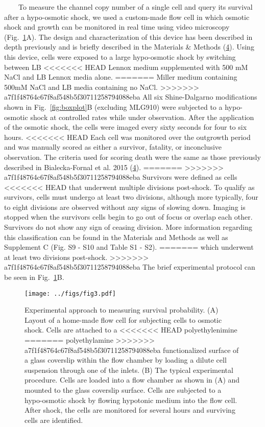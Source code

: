 ~~~~To
measure
the
channel
copy
number
of a
single
cell
and
query
its
survival
after
a
hypo-osmotic
shock,
we
used a
custom-made
flow
cell
in
which
osmotic
shock
and
growth
can be
monitored
in
real
time
using
video
microscopy
(Fig.~\ref{fig:flow_cell}A).
The
design
and
characterization
of
this
device
has
been
described
in
depth
previously
and is
briefly
described
in the
Materials
\&
Methods
(\protect\hyperlink{ref-bialecka-fornal2015}{4}).
Using
this
device,
cells
were
exposed
to a
large
hypo-osmotic
shock
by
switching
between
LB
<<<<<<< HEAD
Lennox
medium
supplemented
with
500 mM
NaCl
and LB
Lennox
media
alone.
=======
Miller
medium
containing
500mM
NaCl
and LB
media
containing
no
NaCl.
>>>>>>> a7f1f48764c67f8af548b5f30711258794088eba
All
six
Shine-Dalgarno
modifications
shown
in
Fig.~\ref{fig:boxplot}B
(excluding
MLG910)
were
subjected
to a
hypo-osmotic
shock
at
controlled
rates
while
under
observation.
After
the
application
of the
osmotic
shock,
the
cells
were
imaged
every
sixty
seconds
for
four
to six
hours.
<<<<<<< HEAD
Each
cell
was
monitored
over
the
outgrowth
period
and
was
manually
scored
as
either
a
survivor,
fatality,
or
inconclusive
observation.
The
criteria
used
for
scoring
death
were
the
same
as
those
previously
described
in
Bialecka-Fornal
et al.
2015
(\protect\hyperlink{ref-bialecka-fornal2015}{4}).
=======
>>>>>>> a7f1f48764c67f8af548b5f30711258794088eba
Survivors
were
defined
as
cells
<<<<<<< HEAD
that
underwent
multiple
divisions
post-shock.
To
qualify
as
survivors,
cells
must
undergo
at
least
two
divisions,
although
more
typically,
four
to
eight
divisions
are
observed
without
any
signs
of
slowing
down.
Imaging
is
stopped
when
the
survivors
cells
begin
to go
out of
focus
or
overlap
each
other.
Survivors
do not
show
any
sign
of
ceasing
division.
More
information
regarding
this
classification
can be
found
in the
Materials
and
Methods
as
well
as
Supplement
C
(Fig.
S9 -
S10
and
Table
S1 -
S2).
=======
which
underwent
at
least
two
divisions
post-shock.
>>>>>>> a7f1f48764c67f8af548b5f30711258794088eba
The
brief
experimental
protocol
can be
seen
in
Fig.~\ref{fig:flow_cell}B.

\begin{figure}
\centering
\texttt{[image: ../figs/fig3.pdf]}
\caption{Experimental
approach
to
measuring
survival
probability.
(A)
Layout
of a
home-made
flow
cell
for
subjecting
cells
to
osmotic
shock.
Cells
are
attached
to a
<<<<<<< HEAD
polyethylenimine
=======
polyethylamine
>>>>>>> a7f1f48764c67f8af548b5f30711258794088eba
functionalized
surface
of a
glass
coverslip
within
the
flow
chamber
by
loading
a
dilute
cell
suspension
through
one of
the
inlets.
(B)
The
typical
experimental
procedure.
Cells
are
loaded
into a
flow
chamber
as
shown
in (A)
and
mounted
to the
glass
coverslip
surface.
Cells
are
subjected
to a
hypo-osmotic
shock
by
flowing
hypotonic
medium
into
the
flow
cell.
After
shock,
the
cells
are
monitored
for
several
hours
and
surviving
cells
are
identified.}\label{fig:flow_cell}
\end{figure}

